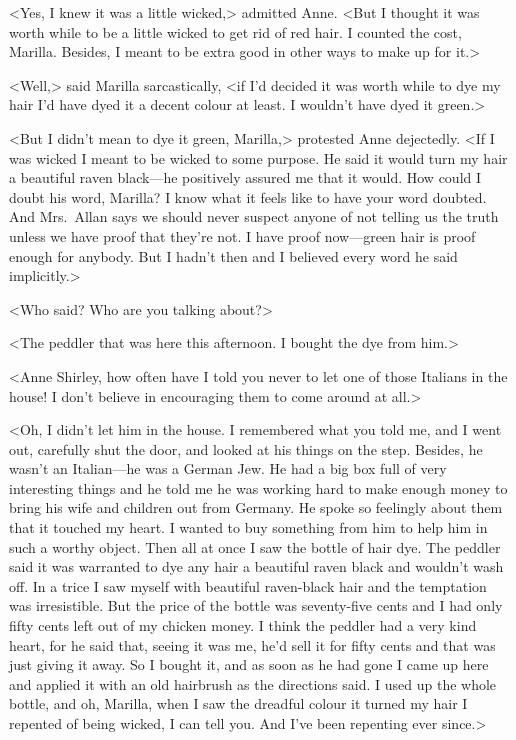 <Yes, I knew it was a little wicked,> admitted Anne. <But I thought it was worth while to be a little wicked to get rid of red hair. I counted the cost, Marilla. Besides, I meant to be extra good in other ways to make up for it.>

<Well,> said Marilla sarcastically, <if I'd decided it was worth while to dye my hair I'd have dyed it a decent colour at least. I wouldn't have dyed it green.>

<But I didn't mean to dye it green, Marilla,> protested Anne dejectedly. <If I was wicked I meant to be wicked to some purpose. He said it would turn my hair a beautiful raven black—he positively assured me that it would. How could I doubt his word, Marilla? I know what it feels like to have your word doubted. And Mrs.~Allan says we should never suspect anyone of not telling us the truth unless we have proof that they're not. I have proof now—green hair is proof enough for anybody. But I hadn't then and I believed every word he said implicitly.>

<Who said? Who are you talking about?>

<The peddler that was here this afternoon. I bought the dye from him.>

<Anne Shirley, how often have I told you never to let one of those Italians in the house! I don't believe in encouraging them to come around at all.>

<Oh, I didn't let him in the house. I remembered what you told me, and I went out, carefully shut the door, and looked at his things on the step. Besides, he wasn't an Italian—he was a German Jew. He had a big box full of very interesting things and he told me he was working hard to make enough money to bring his wife and children out from Germany. He spoke so feelingly about them that it touched my heart. I wanted to buy something from him to help him in such a worthy object. Then all at once I saw the bottle of hair dye. The peddler said it was warranted to dye any hair a beautiful raven black and wouldn't wash off. In a trice I saw myself with beautiful raven-black hair and the temptation was irresistible. But the price of the bottle was seventy-five cents and I had only fifty cents left out of my chicken money. I think the peddler had a very kind heart, for he said that, seeing it was me, he'd sell it for fifty cents and that was just giving it away. So I bought it, and as soon as he had gone I came up here and applied it with an old hairbrush as the directions said. I used up the whole bottle, and oh, Marilla, when I saw the dreadful colour it turned my hair I repented of being wicked, I can tell you. And I've been repenting ever since.>

